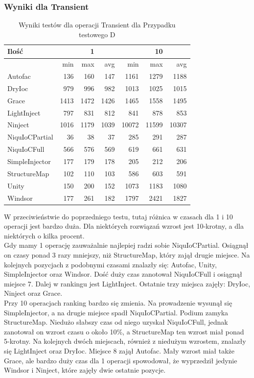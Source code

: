 \documentclass[12pt]{article}
\begin{document}
\subsubsection{Wyniki dla Transient}
\begin{table}[H]
\captionsetup{belowskip=0pt,aboveskip=0pt}
\begin{center}
\begin{small}
	\begin{tabular}{ | l | r r r | r r r | }
    		\hline
Ilość & & 1 & & & 10 & \\ \hline
 & min & max & avg & min & max & avg \\ \hline
Autofac & 136 & 160 & 147 & 1161 & 1279 & 1188 \\ \hline
DryIoc & 979 & 996 & 982 & 1013 & 1025 & 1015 \\ \hline
Grace & 1413 & 1472 & 1426 & 1465 & 1558 & 1495 \\ \hline
LightInject & 797 & 831 & 812 & 841 & 878 & 853 \\ \hline
Ninject & 1016 & 1179 & 1039 & 10072 & 11599 & 10307 \\ \hline
NiquIoCPartial & 36 & 38 & 37 & 285 & 291 & 287 \\ \hline
NiquIoCFull & 566 & 576 & 569 & 619 & 661 & 631 \\ \hline
SimpleInjector & 177 & 179 & 178 & 205 & 212 & 206 \\ \hline
StructureMap & 102 & 110 & 103 & 586 & 603 & 591 \\ \hline
Unity & 150 & 200 & 152 & 1073 & 1183 & 1080 \\ \hline
Windsor & 177 & 261 & 182 & 1797 & 2421 & 1827 \\ \hline
  	\end{tabular}
\end{small}
\end{center}
\caption{Wyniki testów dla operacji Transient dla Przypadku testowego D}
\label{TestCaseD_Transient}
\end{table}
W przeciwieństwie do poprzedniego testu, tutaj różnica w czasach dla 1 i 10 operacji jest bardzo duża. Dla niektórych rozwiązań wzrost jest 10-krotny, a dla niektórych o kilka procent.\\
Gdy mamy 1 operację zauważalnie najlepiej radzi sobie NiquIoCPartial. Osiągnął on czasy ponad 3 razy mniejszy, niż StructureMap, który zajął drugie miejsce. Na kolejnych pozycjach z podobnymi czasami znalazły się: Autofac, Unity, SimpleInjector oraz Windsor. Dość duży czas zanotował NiquIoCFull i osiągnął miejsce 7. Dalej w rankingu jest LightInject. Ostatnie trzy miejsca zajęły: DryIoc, Ninject oraz Grace.\\
Przy 10 operacjach ranking bardzo się zmienia. Na prowadzenie wysunął się SimpleInjector, a na drugie miejsce spadł NiquIoCPartial. Podium zamyka StructureMap. Niedużo słabszy czas od niego uzyskał NiquIoCFull, jednak zanotował on wzrost czasu o około 10\%, a StructureMap ten wzrost miał ponad 5-krotny. Na kolejnych dwóch miejscach, również z niedużym wzrostem, znalazły się LightInject oraz DryIoc. Miejsce 8 zajął Autofac. Mały wzrost miał także Grace, ale bardzo duży czas dla 1 operacji spowodował, że wyprzedził jedynie Windsor i Ninject, które zajęły dwie ostatnie pozycje.
\end{document}
